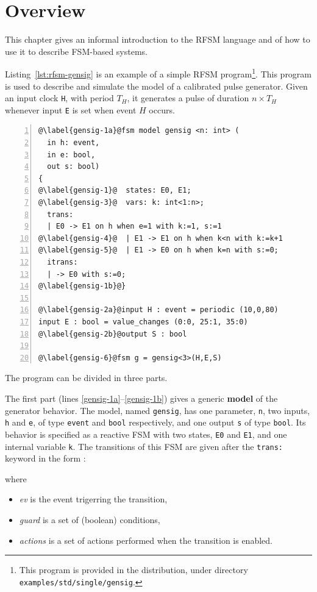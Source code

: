 \chapter{Overview}
\label{cha:overview}

This chapter gives an informal introduction to the RFSM language and of how to use it to describe 
FSM-based systems.

\medskip
Listing~\ref{lst:rfsm-gensig} is an example of a simple RFSM program\footnote{This program is
  provided in the distribution, under directory \texttt{examples/std/single/gensig}.}. This program is
used to describe and simulate the model of a calibrated pulse generator. Given an input clock
\verb|H|, with period $T_H$, it generates a pulse of duration $n \times T_H$ whenever input
\texttt{E} is set when event $H$ occurs.

\begin{lstlisting}[language=Rfsm,frame=single,numbers=left,caption=A simple RFSM
  program,label={lst:rfsm-gensig}]
@\label{gensig-1a}@fsm model gensig <n: int> (
  in h: event,
  in e: bool,
  out s: bool)
{
@\label{gensig-1}@  states: E0, E1;
@\label{gensig-3}@  vars: k: int<1:n>;
  trans:
  | E0 -> E1 on h when e=1 with k:=1, s:=1
@\label{gensig-4}@  | E1 -> E1 on h when k<n with k:=k+1
@\label{gensig-5}@  | E1 -> E0 on h when k=n with s:=0;
  itrans:
  | -> E0 with s:=0;
@\label{gensig-1b}@}

@\label{gensig-2a}@input H : event = periodic (10,0,80)
input E : bool = value_changes (0:0, 25:1, 35:0)
@\label{gensig-2b}@output S : bool 

@\label{gensig-6}@fsm g = gensig<3>(H,E,S)
\end{lstlisting}

\medskip
The program can be divided in three parts.

\medskip The first part (lines \ref{gensig-1a}--\ref{gensig-1b}) gives a generic \textbf{model} of
the generator behavior. The model, named \verb|gensig|, has one parameter, \verb|n|, two inputs,
\verb|h| and \verb|e|, of type \verb|event| and \verb|bool| respectively, and one output \verb|s| of
type \verb|bool|. Its behavior is specified as a reactive FSM with two states, \verb|E0| and
\verb|E1|, and one internal variable \verb|k|. The transitions of this FSM are given after the
\verb|trans:| keyword in the form :
\begin{center}
\end{center}
where
\begin{itemize}
\item \emph{ev} is the event trigerring the transition,
\item \emph{guard} is a set of (boolean) conditions,
\item \emph{actions} is a set of actions performed when the transition is enabled.
\end{itemize}

